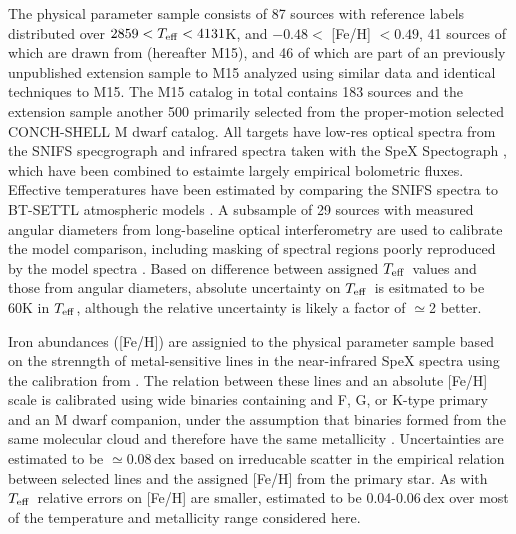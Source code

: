 \documentclass[modern]{aastex62}
\newcommand{\teff}{$T_{\rm eff}$}
\begin{document}
The physical parameter sample consists of 87 sources with reference labels distributed over $2859 <T_{\rm eff} < 4131$K, and $-0.48 <$ [Fe/H] $< 0.49$, 41 sources of which are drawn from \citealt{Mann:2015} (hereafter M15), and 46 of which are part of an previously unpublished extension sample to M15 analyzed using similar data and identical techniques to M15. The M15 catalog in total contains 183 sources and the extension sample another 500 primarily selected from the proper-motion selected CONCH-SHELL \citep{Gaidos:2013} M dwarf catalog. All targets have low-res optical spectra from the SNIFS specgrograph \citep{Lantz:2004} and infrared spectra taken with the SpeX Spectograph \citep{Rayner:2003}, which have been combined to estaimte largely empirical bolometric fluxes. Effective temperatures have been estimated by comparing the SNIFS spectra to BT-SETTL atmospheric models \citep{Allard:2011}. A subsample of 29 sources with measured angular diameters from long-baseline optical interferometry \citep{Boyajian:2012} are used to calibrate the model comparison, including masking of spectral regions poorly reproduced by the model spectra \citep{Mann:2013c}. Based on difference between assigned \teff\ values and those from angular diameters, absolute uncertainty on \teff\ is esitmated to be 60K in \teff, although the relative uncertainty is likely a factor of $\simeq$2 better.

Iron abundances ([Fe/H]) are assignied to the physical parameter sample based on the strenngth of metal-sensitive lines in the near-infrared SpeX spectra \citep{RojasAyala:2010} using the calibration from \citet{Mann:2013a}. The relation between these lines and an absolute [Fe/H] scale is calibrated using wide binaries containing and F, G, or K-type primary and an M dwarf companion, under the assumption that binaries formed from the same molecular cloud and therefore have the same metallicity \citep{Bonfils:2005}. Uncertainties are estimated to be $\simeq$0.08\,dex based on irreducable scatter in the empirical relation between selected lines and the assigned [Fe/H] from the primary star. As with \teff\ relative errors on [Fe/H] are smaller, estimated to be 0.04-0.06\,dex over most of the temperature and metallicity range considered here.
\end{document}
